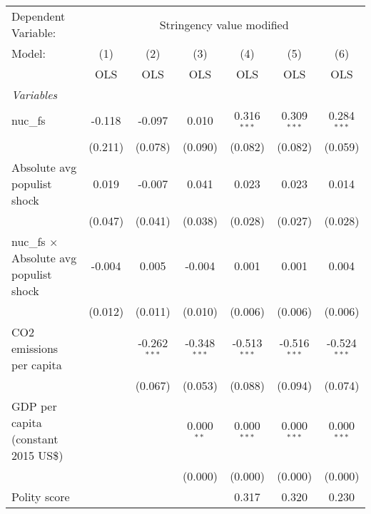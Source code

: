 
\begingroup
\centering
\begin{tabular}{lcccccc}
   \toprule
   Dependent Variable: & \multicolumn{6}{c}{Stringency value modified}\\
   Model:                                         & (1)     & (2)            & (3)            & (4)            & (5)            & (6)\\  
                                                  &  OLS    & OLS            & OLS            & OLS            & OLS            & OLS\\  
   \midrule
   \emph{Variables}\\
   nuc\_fs                                        & -0.118  & -0.097         & 0.010          & 0.316$^{***}$  & 0.309$^{***}$  & 0.284$^{***}$\\   
                                                  & (0.211) & (0.078)        & (0.090)        & (0.082)        & (0.082)        & (0.059)\\   
   Absolute avg populist shock                    & 0.019   & -0.007         & 0.041          & 0.023          & 0.023          & 0.014\\   
                                                  & (0.047) & (0.041)        & (0.038)        & (0.028)        & (0.027)        & (0.028)\\   
   nuc\_fs $\times$ Absolute avg populist shock   & -0.004  & 0.005          & -0.004         & 0.001          & 0.001          & 0.004\\   
                                                  & (0.012) & (0.011)        & (0.010)        & (0.006)        & (0.006)        & (0.006)\\   
   CO2 emissions per capita                       &         & -0.262$^{***}$ & -0.348$^{***}$ & -0.513$^{***}$ & -0.516$^{***}$ & -0.524$^{***}$\\   
                                                  &         & (0.067)        & (0.053)        & (0.088)        & (0.094)        & (0.074)\\   
   GDP per capita (constant 2015 US\$)            &         &                & 0.000$^{**}$   & 0.000$^{***}$  & 0.000$^{***}$  & 0.000$^{***}$\\   
                                                  &         &                & (0.000)        & (0.000)        & (0.000)        & (0.000)\\   
   Polity score                                   &         &                &                & 0.317          & 0.320          & 0.230\\   

\end{tabular}
